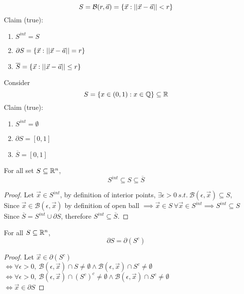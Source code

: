 \documentclass[]{article}
\newcommand{\ball}[2]{\mathcal{B}({#1}, {#2})}
\begin{document}
	\begin{example}
		\[
			S = \ball{r}{\vec{a}} = \{\vec{x}: \Norm{\vec{x} - \vec{a}} < r\}
		\]
		Claim (true):
		\begin{enumerate}
			\item $S^{int} = S$ 
			\item $\partial S = \{\vec{x}: \vert \vert {\vec{x} - \vec{a}} \vert \vert = r\}$
			\item $\overline{S} = \{\vec{x}: \vert \vert {\vec{x} - \vec{a}} \vert \vert \leq r\} $
		\end{enumerate}
	\end{example}
	
	\begin{example}
		Consider 
		\[
			S = \{x \in (0, 1): x \in \mathbb{Q}\} \subseteq \mathbb{R}
		\]
		Claim (true):
		\begin{enumerate}
			\item $S^{int} = \emptyset$
			\item $\partial S = [0,1]$
			\item $\overline{S} = [0,1]$
		\end{enumerate}
	\end{example}
	
	\begin{theorem}
		For all set $S \subseteq \mathbb{R}^n$, 
		\[
			S^{int} \subseteq S \subseteq \overline{S}
		\]
	\end{theorem}
	\begin{proof}
		Let $\vec{x} \in S^{int}$, by definition of interior points, $\exists \epsilon > 0\ s.t.\ \ball{\epsilon}{\vec{x}} \subseteq S$, \\
		Since $\vec{x} \in \ball{\epsilon}{\vec{x}}$ by definition of open ball $\implies \vec{x} \in S\ \forall \vec{x} \in S^{int} \implies S^{int} \subseteq S$\\
		Since $\overline{S} = S^{int} \cup \partial S$, therefore $S^{int} \subseteq \overline{S}$. 
	\end{proof}
	
	\begin{theorem}
		For all $S \subseteq \mathbb{R}^n$, 
		\[
			\partial S = \partial (S^c)
		\]
	\end{theorem}
	
	\begin{proof}
		Let $\vec{x} \in \partial (S^c)$ \\
		$\iff \forall \epsilon > 0,\ \ball{\epsilon}{\vec{x}} \cap S \neq \emptyset \land \ball{\epsilon}{\vec{x}} \cap S^c \neq \emptyset$ \\
		$\iff \forall \epsilon > 0, \ \ball{\epsilon}{\vec{x}} \cap (S^c)^c \neq \emptyset \land \ball{\epsilon}{\vec{x}} \cap S^c \neq \emptyset$ \\
		$\iff \vec{x} \in \partial S$
	\end{proof}
	
\end{document}
